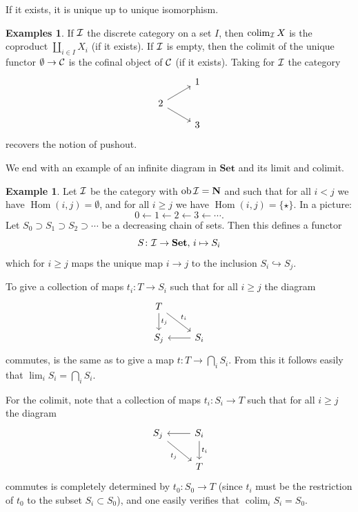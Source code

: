 \documentclass[11pt]{amsbook}
\newcommand{\injto}{\hookrightarrow}
\newcommand{\longfrom}{\longleftarrow}
\DeclareMathOperator\Hom{Hom}
\DeclareMathOperator\ob{ob}
\DeclareMathOperator\colim{colim}
\def\bN{{\mathbf{N}}}
\def\Set{\mathbf{Set}}
\theoremstyle{plain}
\theoremstyle{definition}
\newtheorem{example}[theorem]{Example}
\newtheorem{examples}[theorem]{Examples}
\begin{document}
If it exists, it is unique up to unique isomorphism.

\begin{examples}
If ${\mathcal{I}}$ the discrete category on a set $I$, then $\colim_\cI X$ is the coproduct $\coprod_{i\in I} X_i$ (if it exists). If ${\mathcal{I}}$ is empty, then the colimit of the unique functor $\emptyset\to {\mathcal{C}}$ is the cofinal object of ${\mathcal{C}}$ (if it exists). Taking for ${\mathcal{I}}$ the category
\[
\begin{tikzcd}[row sep=small]
	& 1  \\  2 \arrow{ru} \arrow{rd}  & \\ & 3  
\end{tikzcd}
\]
recovers the notion of pushout. 
\end{examples}

We end with an example of an infinite diagram in $\Set$ and its limit and colimit.

\begin{example}\label{exa:descending-chain-of-inclusions}
Let ${\mathcal{I}}$ be the category with $\ob \cI = \bN$ and such that for all $i<j$ we have $\Hom(i,j) = \emptyset$, and for all $i\geq j$ we have $\Hom(i,j)=\{\star\}$. In a picture:
\[
	0 \longfrom 1 \longfrom 2 \longfrom 3 \longfrom \cdots.
\]
Let $S_0 \supset S_1 \supset S_2 \supset \cdots $ be a decreasing chain of sets. Then this defines a functor
\[
	S \colon \cI \to \Set,\, i \mapsto S_i
\]
which for $i\geq j$ maps the unique map $i\to j$ to the inclusion $S_i \injto S_j$.

To give a collection of maps $t_i\colon T\to S_i$ such that for all $i\geq j$ the diagram
\[
\begin{tikzcd}
	T \arrow{d}{t_j} \arrow{dr}{t_i} \\
	S_j  & S_i \arrow{l}
\end{tikzcd}
\]
commutes, is the same as to give a map $t\colon T \to \bigcap_i S_i$. From this it follows easily that $\lim_i S_i = \bigcap_i S_i$.

For the colimit, note that a collection of maps $t_i\colon S_i \to T$ such that for all $i\geq j$ the diagram
\[
\begin{tikzcd}
	S_j  \arrow[swap]{dr}{t_j}  & S_i \arrow{d}{t_i} \arrow{l} \\
	& T
\end{tikzcd}
\]
commutes is completely determined by $t_0\colon S_0\to T$ (since $t_i$ must be the restriction of $t_0$ to the subset $S_i\subset S_0$), and one easily verifies that $\colim_i S_i = S_0$.
\end{example}
\end{document}
